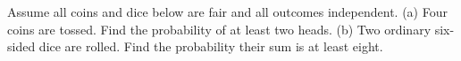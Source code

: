 Assume all coins and dice below are fair and all outcomes independent. (a) Four coins are tossed. Find the probability of at least two heads. (b) Two ordinary six-sided dice are rolled. Find the probability their sum is at least eight.
